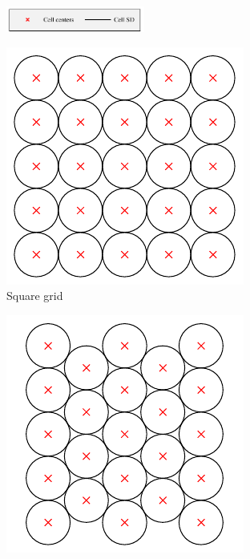 \documentclass[thesis.tex]{subfiles}
\begin{document}
\begin{figure}[tb]
	\centering
	\begin{subfigure}[t]{\textwidth}
		\centering
		\includegraphics[width=0.5\textwidth]{img/gridType_legend_cropped.pdf}
	\end{subfigure}
	\begin{subfigure}[t]{0.45\textwidth}
		\includegraphics[width=\textwidth]{img/gridType_square_window.pdf}
		\caption{Square grid}
		\label{fig:gridTypeSquare}
	\end{subfigure}
	\begin{subfigure}[t]{0.45\textwidth}
		\includegraphics[width=\textwidth]{img/gridType_triangle_window.pdf}

\end{subfigure}
\end{figure}
\end{document}
